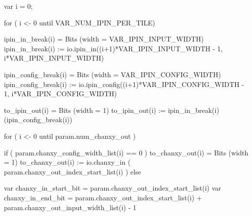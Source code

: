 \begin{scala}
{  var i = 0;                                                                                                     
                                                                                                                 
  for ( i <- 0 until VAR_NUM_IPIN_PER_TILE) {                                                                    
    ipin_in_break(i) = Bits (width = VAR_IPIN_INPUT_WIDTH)                                                       
    ipin_in_break(i) := io.ipin_in((i+1)*VAR_IPIN_INPUT_WIDTH - 1, i*VAR_IPIN_INPUT_WIDTH)                       
                                                                                                                 
    ipin_config_break(i) = Bits (width = VAR_IPIN_CONFIG_WIDTH)                                                  
    ipin_config_break(i) := io.ipin_config((i+1)*VAR_IPIN_CONFIG_WIDTH - 1, i*VAR_IPIN_CONFIG_WIDTH)             
                                                                                                                 
    to_ipin_out(i) = Bits (width = 1)                                                                            
    to_ipin_out(i) := ipin_in_break(i)(ipin_config_break(i))                                                     
  }                                                                                                              
                                                                                                                 
  for ( i <- 0 until param.num_chanxy_out )                                                                      
  {                                                                                                              
      if ( param.chanxy_config_width_list(i) == 0 )                                                              
      {                                                                                                          
          to_chanxy_out(i) = Bits (width = 1)                                                                    
          to_chanxy_out(i) := io.chanxy_in ( param.chanxy_out_index_start_list(i) )                              
      }                                                                                                          
      else                                                                                                       
      {                                                                                                          
          var chanxy_in_start_bit = param.chanxy_out_index_start_list(i)                                         
          var chanxy_in_end_bit = param.chanxy_out_index_start_list(i) + param.chanxy_out_input_width_list(i) - 1
                                                                                                                 
}}}
\end{scala}
